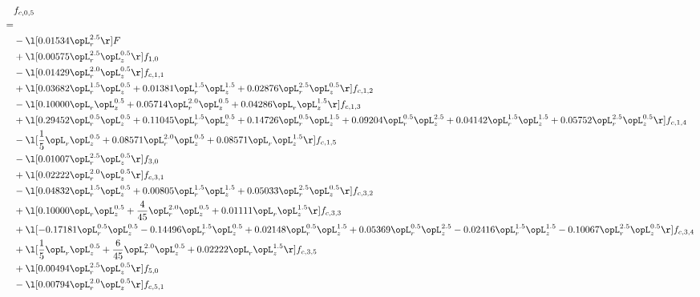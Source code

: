 \begin{alignat}{2} 
\label{eq:f_05_1} 
& f_{c,0,5} \nonumber \\ 
 = \\ 
& - \l[  0.01534 \opL_r^{2.5}  \r] F \nonumber \\ 
& + \l[  0.00575 \opL_r^{2.5} \opL_z^{0.5}  \r] f_{1,0} \nonumber \\ 
& - \l[  0.01429 \opL_r^{2.0} \opL_z^{0.5}  \r] f_{c,1,1} \nonumber \\ 
& + \l[  0.03682 \opL_r^{1.5} \opL_z^{0.5} +  0.01381 \opL_r^{1.5} \opL_z^{1.5} +  0.02876 \opL_r^{2.5} \opL_z^{0.5}  \r] f_{c,1,2} \nonumber \\ 
& - \l[  0.10000 \opL_r \opL_z^{0.5} +  0.05714 \opL_r^{2.0} \opL_z^{0.5} +  0.04286 \opL_r \opL_z^{1.5}  \r] f_{c,1,3} \nonumber \\ 
& + \l[  0.29452 \opL_r^{0.5} \opL_z^{0.5} +  0.11045 \opL_r^{1.5} \opL_z^{0.5} +  0.14726 \opL_r^{0.5} \opL_z^{1.5} +  0.09204 \opL_r^{0.5} \opL_z^{2.5} +  0.04142 \opL_r^{1.5} \opL_z^{1.5} +  0.05752 \opL_r^{2.5} \opL_z^{0.5}  \r] f_{c,1,4} \nonumber \\ 
& - \l[ \frac{1}{5} \opL_r \opL_z^{0.5} +  0.08571 \opL_r^{2.0} \opL_z^{0.5} +  0.08571 \opL_r \opL_z^{1.5}  \r] f_{c,1,5} \nonumber \\ 
& - \l[  0.01007 \opL_r^{2.5} \opL_z^{0.5}  \r] f_{3,0} \nonumber \\ 
& + \l[  0.02222 \opL_r^{2.0} \opL_z^{0.5}  \r] f_{c,3,1} \nonumber \\ 
& - \l[  0.04832 \opL_r^{1.5} \opL_z^{0.5} +  0.00805 \opL_r^{1.5} \opL_z^{1.5} +  0.05033 \opL_r^{2.5} \opL_z^{0.5}  \r] f_{c,3,2} \nonumber \\ 
& + \l[  0.10000 \opL_r \opL_z^{0.5} + \frac{4}{45} \opL_r^{2.0} \opL_z^{0.5} +  0.01111 \opL_r \opL_z^{1.5}  \r] f_{c,3,3} \nonumber \\ 
& + \l[  -0.17181 \opL_r^{0.5} \opL_z^{0.5}   -0.14496 \opL_r^{1.5} \opL_z^{0.5} +  0.02148 \opL_r^{0.5} \opL_z^{1.5} +  0.05369 \opL_r^{0.5} \opL_z^{2.5}   -0.02416 \opL_r^{1.5} \opL_z^{1.5}   -0.10067 \opL_r^{2.5} \opL_z^{0.5}  \r] f_{c,3,4} \nonumber \\ 
& + \l[ \frac{1}{5} \opL_r \opL_z^{0.5} + \frac{6}{45} \opL_r^{2.0} \opL_z^{0.5} +  0.02222 \opL_r \opL_z^{1.5}  \r] f_{c,3,5} \nonumber \\ 
& + \l[  0.00494 \opL_r^{2.5} \opL_z^{0.5}  \r] f_{5,0} \nonumber \\ 
& - \l[  0.00794 \opL_r^{2.0} \opL_z^{0.5}  \r] f_{c,5,1} \nonumber \\ 

\end{alignat}
